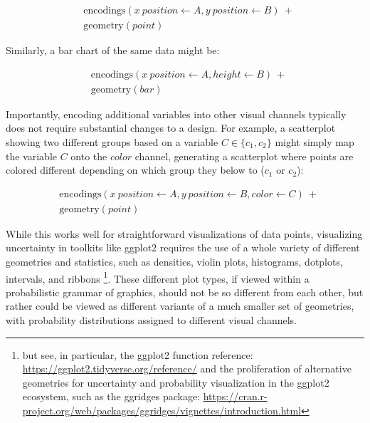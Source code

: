 \documentclass[11pt]{article}
\begin{document}
\begin{align*}
    &\textrm{encodings}(x~position \leftarrow A, y~position \leftarrow B)~+\\
    &\textrm{geometry}(point) 
\end{align*}

Similarly, a bar chart of the same data might be:

\begin{align*}
    &\textrm{encodings}(x~position \leftarrow A, height \leftarrow B)~+\\
    &\textrm{geometry}(bar) 
\end{align*}

Importantly, encoding additional variables into other visual channels typically does not require substantial changes to a design. For example, a scatterplot showing two different groups based on a variable $C \in \{c_1, c_2\}$ might simply map the variable $C$ onto the $color$ channel, generating a scatterplot where points are colored different depending on which group they below to ($c_1$ or $c_2$):

\begin{align*}
    &\textrm{encodings}(x~position \leftarrow A, y~position \leftarrow B, color \leftarrow C)~+\\
    &\textrm{geometry}(point) 
\end{align*}




While this works well for straightforward visualizations of data points, visualizing uncertainty in toolkits like ggplot2 requires the use of a whole variety of different geometries and statistics, such as densities, violin plots, histograms, dotplots, intervals, and ribbons \cite{wickham2016ggplot2}\footnote{but see, in particular, the ggplot2 function reference: \url{https://ggplot2.tidyverse.org/reference/} and the proliferation of alternative geometries for uncertainty and probability visualization in the ggplot2 ecosystem, such as the ggridges package: \url{https://cran.r-project.org/web/packages/ggridges/vignettes/introduction.html}}. These different plot types, if viewed within a probabilistic grammar of graphics, should not be so different from each other, but rather could be viewed as different variants of a much smaller set of geometries, with probability distributions assigned to different visual channels.
\end{document}
